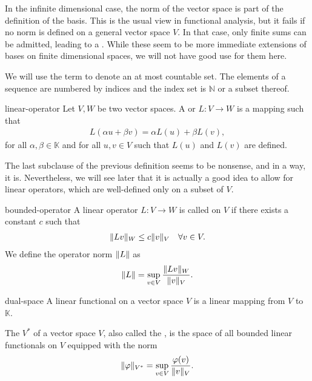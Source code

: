 \begin{remark}
  In the infinite dimensional case, the norm of the vector space is
  part of the definition of the basis. This is the usual view in
  functional analysis, but it fails if no norm is defined on a general
  vector space $V$. In that case, only finite sums can be admitted,
  leading to a . While these seem to be more
  immediate extensions of bases on finite dimensional spaces, we will
  not have good use for them here.
\end{remark}

\begin{notation}
  We will use the term  to denote an at most
  countable set. The elements of a sequence are numbered by indices
  and the index set is $\mathbb N$ or a subset thereof.
\end{notation}

\begin{Definition}{linear-operator}
  Let $V,W$ be two vector spaces. A  or
   $L\colon V\to W$ is a mapping such that
  \begin{gather*}
    L(\alpha u+\beta v) = \alpha L(u) + \beta L(v),
  \end{gather*}
  for all $\alpha,\beta\in\mathbb K$ and for all $u,v\in V$ such that
  $L(u)$ and $L(v)$ are defined.
\end{Definition}

\begin{remark}
  The last subclause of the previous definition seems to be nonsense,
  and in a way, it is. Nevertheless, we will see later that it is
  actually a good idea to allow for linear operators, which are
  well-defined only on a subset of $V$.
\end{remark}

\begin{Definition}{bounded-operator}
  A linear operator $L\colon V\to W$ is called  on $V$
  if there exists a constant $c$ such that
  \begin{gather}
    \lVert L v\rVert_W \le c \lVert v\rVert_V
    \quad\forall v\in V.
  \end{gather}
  We define the operator norm $\lVert L\rVert$ as
  \begin{gather}
    \lVert L\rVert = \sup_{v\in V} \frac{\lVert L v\rVert_W}{\lVert v\rVert_V}.
  \end{gather}
\end{Definition}


\begin{Definition}{dual-space}
  A linear functional on a vector space $V$ is a linear mapping from
  $V$ to $\mathbb K$.

  The  $V^*$ of a vector space $V$, also called the
  , is the space of all bounded linear functionals
  on $V$ equipped with the norm
  \begin{gather}
    \lVert\varphi\rVert_{V^*} = \sup_{v\in V} \frac{\varphi(v)}{\lVert v\rVert_V}.
  \end{gather}
\end{Definition}

